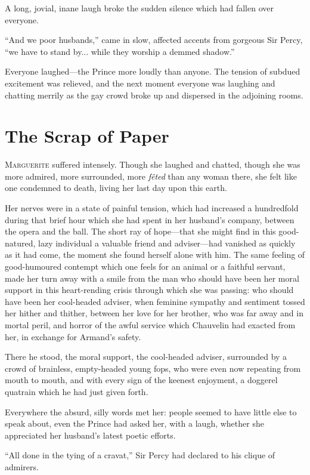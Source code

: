 \documentclass[paper=5.5in:8.5in,BCOR=7mm,twoside,DIV=calc,12pt,usegeometry,chapterprefix,endperiod,headings=big]{scrbook}
\begin{document}
A long, jovial, inane laugh broke the sudden silence which had fallen over everyone.

\enquote{And we poor husbands,} came in slow, affected accents from gorgeous Sir Percy, \enquote{we have to stand by... while they worship a demmed shadow.}

Everyone laughed---the Prince more loudly than anyone. The tension of subdued excitement was relieved, and the next moment everyone was laughing and chatting merrily as the gay crowd broke up and dispersed in the adjoining rooms.

\chapter{The Scrap of Paper}
\lettrine[lines=4]{M}{arguerite} suffered intensely. Though she laughed and chatted, though she was more admired, more surrounded, more \textit{fêted} than any woman there, she felt like one condemned to death, living her last day upon this earth.

Her nerves were in a state of painful tension, which had increased a hundredfold during that brief hour which she had spent in her husband's company, between the opera and the ball. The short ray of hope---that she might find in this good-natured, lazy individual a valuable friend and adviser---had vanished as quickly as it had come, the moment she found herself alone with him. The same feeling of good-humoured contempt which one feels for an animal or a faithful servant, made her turn away with a smile from the man who should have been her moral support in this heart-rending crisis through which she was passing: who should have been her cool-headed adviser, when feminine sympathy and sentiment tossed her hither and thither, between her love for her brother, who was far away and in mortal peril, and horror of the awful service which Chauvelin had exacted from her, in exchange for Armand's safety.

There he stood, the moral support, the cool-headed adviser, surrounded by a crowd of brainless, empty-headed young fops, who were even now repeating from mouth to mouth, and with every sign of the keenest enjoyment, a doggerel quatrain which he had just given forth.

Everywhere the absurd, silly words met her: people seemed to have little else to speak about, even the Prince had asked her, with a laugh, whether she appreciated her husband's latest poetic efforts.

\enquote{All done in the tying of a cravat,} Sir Percy had declared to his clique of admirers.
\end{document}
